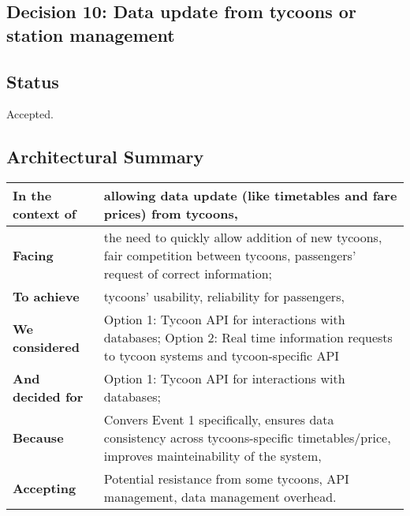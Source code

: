 \subsection{Decision 10: Data update from tycoons or station management}

\subsection*{Status}
Accepted.
\subsection*{Architectural Summary}
\begin{tabular}{|p{3.5cm}|p{10.5cm}|}
    \hline
    \textbf{In the context of} & allowing data update (like timetables and fare prices) from tycoons, \\
    \hline
    \textbf{Facing} & the need to quickly allow addition of new tycoons, fair competition between tycoons, passengers' request of correct information; \\
    \hline
    \textbf{To achieve} & tycoons' usability, reliability for passengers, \\
    \hline
    \textbf{We considered} & Option 1: Tycoon API for interactions with databases; Option 2: Real time information requests to tycoon systems and tycoon-specific API \\
    \hline
    \textbf{And decided for} & Option 1: Tycoon API for interactions with databases;\\
    \hline
    \textbf{Because} & Convers Event 1 specifically, ensures data consistency across tycoons-specific timetables/price, improves mainteinability of the system, \\
    \hline
    \textbf{Accepting} & Potential resistance from some tycoons, API management, data management overhead. \\
    \hline
\end{tabular}


